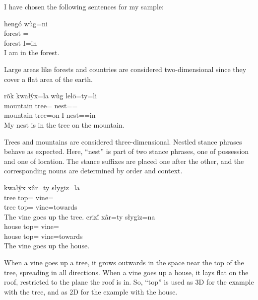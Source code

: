 \documentclass[12pt]{article}
\begin{document}
    I have chosen the following sentences for my sample:

    \begin{exe}
        \ex
        \glll
        hengó wùg=ni \\
        forest \First{}\Sg{}=\InessTwo{}\\
        forest I=in \\
        \glt
        I am in the forest.
    \end{exe}

    Large areas like forests and countries are considered two-dimensional
    since they cover a flat area of the earth.

    \begin{exe}
        \ex
        \glll
        rõk kwałŷx=la wùg lelō=ty=li \\
        mountain tree=\AdessThree{} \First{}\Sg{} nest=\Poss{}=\InessThree{} \\
        mountain tree=on I nest=\Poss{}=in \\
        \glt
        My nest is in the tree on the mountain.
    \end{exe}

    Trees and mountains are considered three-dimensional.
    Nestled stance phrases behave as expected.
    Here, ``nest'' is part of two stance phrases,
    one of possession and one of location.
    The stance suffixes are placed one after the other,
    and the corresponding nouns are determined by order and context.

    \begin{exe}
        \ex
        \glll
        kwałŷx xâr=ty słygiz=la \\
        tree top=\Poss{} vine=\AdessThree{} \\
        tree top=\Poss{} vine=towards \\
        \glt
        The vine goes up the tree.
        \ex
        \glll
        crizǐ xâr=ty słygiz=na \\
        house top=\Poss{} vine=\AdessTwo{} \\
        house top=\Poss{} vine=towards \\
        \glt
        The vine goes up the house.
    \end{exe}

    When a vine goes up a tree,
    it grows outwards in the space near the top of the tree,
    spreading in all directions.
    When a vine goes up a house,
    it lays flat on the roof,
    restricted to the plane the roof is in.
    So, ``top'' is used as 3D for the example with the tree,
    and as 2D for the example with the house.
\end{document}
